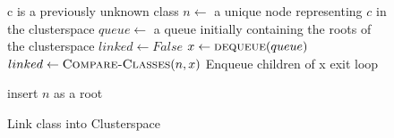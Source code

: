 \documentclass[conference]{IEEEtran}
\begin{document}
\begin{figure}
    \caption{Link class into Clusterspace}
    \label{cs-link-class}
    \begin{algorithmic}
            \Require c is a previously unknown class
            \State $n\gets $ a unique node representing $c$ in the clusterspace
            \State $queue\gets $ a queue initially containing the roots of the clusterspace
            \State $linked\gets False$
            \State $x\gets \Call{dequeue}{queue}$
                \State $linked\gets \Call{Compare-Classes}{n,x}$
                    \State Enqueue children of x
                \Else
                    exit loop
                \EndIf
            \EndWhile

                \State insert $n$ as a root
            \EndIf
        \EndFunction
    \end{algorithmic}
\end{figure}
\end{document}
